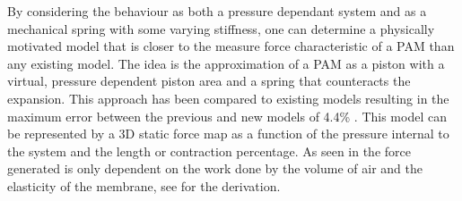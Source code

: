 \documentclass[11pt,a4paper]{article}
\begin{document}
By considering the behaviour as both a pressure dependant system and as a mechanical spring with some varying stiffness, one can determine a physically motivated model that is closer to the measure force characteristic of a PAM than any existing model. The idea is the approximation of a PAM as a piston with a virtual, pressure dependent piston area and a spring that counteracts the expansion. This approach has been compared to existing models resulting in the maximum error between the previous and new models of 4.4\% \cite{martens_boblan_2017}. This model can be represented by a 3D static force map  as a function of the pressure internal to the system and the length or contraction percentage. As seen in  the force generated is only dependent on the work done by the volume of air and the elasticity of the membrane, see  for the derivation.

        
        
        
\end{document}
